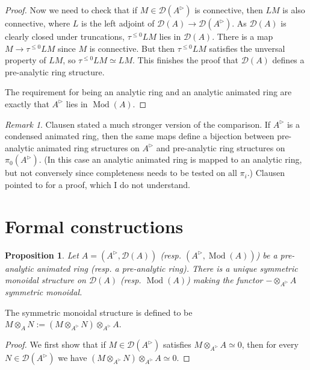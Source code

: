\documentclass{article}
\theoremstyle{plain}
\newtheorem{prop}[thm]{Proposition}
\theoremstyle{definition}
\theoremstyle{remark}
\newtheorem{rmk}[thm]{Remark}
\DeclareMathOperator{\modcat}{Mod}
\newcommand{\huflag}{\triangleright}
\newcommand{\D}{\mathcal{D}}
\begin{document}
\begin{proof}
Now we need to check that if $ M\in \D (A ^{\huflag}) $ is connective, then $ LM $ is also connective, where $ L $ is the left adjoint
of $ \D (A)\to \D (A ^{\huflag}) $.
As $ \D (A) $ is clearly closed under truncations, $ \tau ^{\leq 0} L M $ lies in $ \D (A) $.
There is a map $ M\to \tau ^{\leq 0}LM $ since $ M $ is connective.
But then $ \tau ^{\leq 0}LM $ satisfies the unversal property of $ LM $,
so $ \tau ^{\leq 0}LM\simeq LM $.
This finishes the proof that $ \D (A) $ defines a pre-analytic ring structure.

The requirement for being an analytic ring and an analytic animated ring are exactly that $ A ^{\huflag} $ lies in $ \modcat (A) $.
\end{proof}

\begin{rmk}
Clausen stated a much stronger version of the comparison.
If $ A ^{\huflag} $ is a condensed animated ring, then the same maps define a bijection between pre-analytic animated ring structures on
$ A ^{\huflag} $ and pre-analytic ring structures on $ \pi _{0}(A ^{\huflag}) $.
(In this case an analytic animated ring is mapped to an analytic ring, but not conversely since completeness needs to be tested on all $ \pi _{i} $.)
Clausen pointed to \cite{analytic} for a proof, which I do not understand.
\label{definition::animated}
\end{rmk}

\section{Formal constructions}

\begin{prop}
Let $ A = (A ^{\huflag}, \D (A)) $ (resp. $ (A ^{\huflag}, \modcat (A)) $) be a pre-analytic animated ring (resp. a pre-analytic ring).
There is a unique symmetric monoidal structure on $ \D (A) $ (resp. $ \modcat (A) $) making the functor $ -\otimes _{A ^{\huflag}} A $ symmetric monoidal.
\end{prop}

The symmetric monoidal structure is defined to be $ M \otimes _{A} N := (M \otimes _{A ^{\huflag}} N)\otimes _{A ^{\huflag}} A $.

\begin{proof}
We first show that if $ M \in \D (A ^{\huflag}) $ satisfies $ M\otimes _{A ^{\huflag}} A \simeq 0 $,
then for every $ N\in \D (A ^{\huflag}) $ we have $ (M\otimes _{A ^{\huflag}} N)\otimes _{A ^{\huflag}} A \simeq 0 $.
\end{proof}
\end{document}
